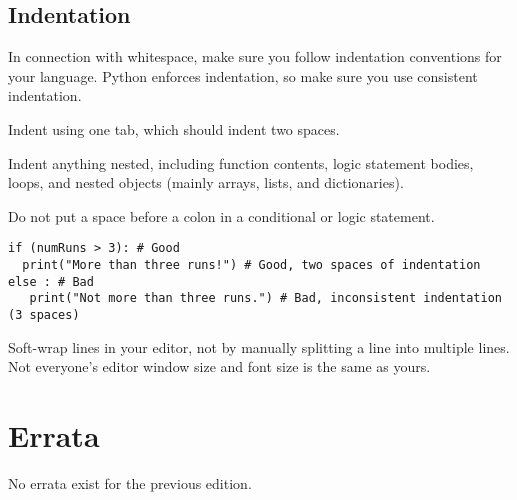 \subsection*{Indentation}

In connection with whitespace, make sure you follow indentation conventions for your language. Python enforces indentation, so make sure you use consistent indentation.

Indent using one tab, which should indent two spaces.

Indent anything nested, including function contents, logic statement bodies, loops, and nested objects (mainly arrays, lists, and dictionaries).

Do not put a space before a colon in a conditional or logic statement.

\begin{lstlisting}[style=pippython]
if (numRuns > 3): # Good
  print("More than three runs!") # Good, two spaces of indentation
else : # Bad
   print("Not more than three runs.") # Bad, inconsistent indentation (3 spaces)
\end{lstlisting}

Soft-wrap lines in your editor, not by manually splitting a line into multiple lines. Not everyone's editor window size and font size is the same as yours. 

\section*{Errata}
No errata exist for the previous edition.